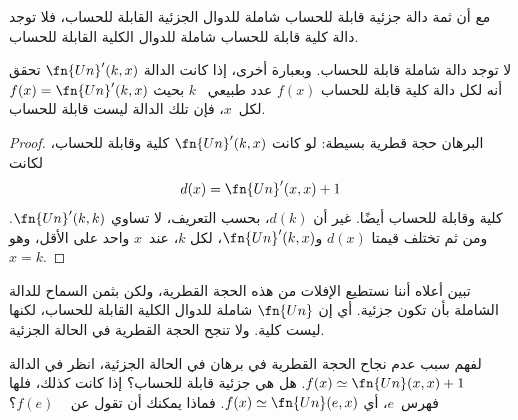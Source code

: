 \documentclass[../../../include/open-logic-section]{subfiles}
\begin{document}

مع أن ثمة دالة جزئية قابلة للحساب شاملة للدوال الجزئية القابلة للحساب،
فلا توجد دالة كلية قابلة للحساب شاملة للدوال الكلية القابلة للحساب.

\begin{thm}
لا توجد دالة شاملة قابلة للحساب. وبعبارة أخرى، إذا كانت الدالة
$\fn{Un}'(k,x)$ تحقق أنه لكل دالة كلية قابلة للحساب $f(x)$ عدد طبيعي
~$k$ بحيث $f(x)=\fn{Un}'(k,x)$ لكل~$x$، فإن تلك الدالة ليست قابلة
للحساب.
\end{thm}

\begin{proof}
البرهان حجة قطرية بسيطة: لو كانت $\fn{Un}'(k,x)$ كلية وقابلة للحساب،
لكانت
\[
d(x) = \fn{Un}'(x, x) + 1
\]
كلية وقابلة للحساب أيضًا. غير أن $d(k)$، بحسب التعريف، لا تساوي
$\fn{Un}'(k,k)$. ومن ثم تختلف قيمتا $d(x)$ و$\fn{Un}'(k,x)$، لكل
$k$، عند~$x$ واحد على الأقل، وهو $x=k$.
\end{proof}

\begin{explain}
تبين  أعلاه أننا نستطيع الإفلات من هذه الحجة
القطرية، ولكن بثمن السماح للدالة الشاملة بأن تكون جزئية. أي إن
$\fn{Un}$ شاملة للدوال الكلية القابلة للحساب، لكنها ليست كلية. ولا
تنجح الحجة القطرية في الحالة الجزئية.
\end{explain}

\begin{prob}
  لفهم سبب عدم نجاح الحجة القطرية في برهان  في
  الحالة الجزئية، انظر في الدالة
  $f(x)\simeq\fn{Un}(x,x)+1$. هل هي جزئية قابلة للحساب؟ إذا كانت كذلك،
  فلها فهرس~$e$، أي $f(x)\simeq\fn{Un}(e,x)$. فماذا يمكنك أن تقول عن
  ~ $f(e)$؟
\end{prob}
\end{document}
